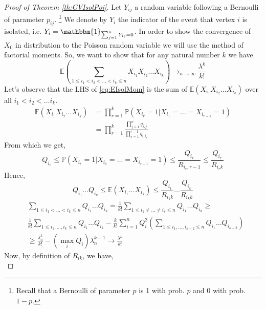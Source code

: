 \begin{proof}[Proof of Theorem \ref{th:CVIsolPoi}]
	Let $Y_{ij}$ a random variable following a Bernoulli of parameter $p_{ij}$.
	\footnote{ Recall that a Bernoulli of parameter $p$ is 1 with prob. $p$ and 0 with prob. $1-p$.}
	We denote by $Y_i$ the indicator of the event that vertex $i$ is isolated, i.e. $Y_i = \mathbbm{1}_{\sum_{j=1}^n Y_{ij} = 0}$.
	In order to show the convergence of $X_0$ in distribution to the Poisson random variable we will use the method of factorial moments.
	So, we want to show that for any natural number $k$ we have
	\begin{equation}\label{eq:EIsolMom}
		\mathbb{E}(\sum_{1\leq i_1<i_2< \ldots < i_k \leq n} X_{i_1}X_{i_2}\ldots X_{i_k}) \to_{n \to \infty} \frac{\lambda^k}{k!}
	\end{equation}
	Let's observe that the LHS of \eqref{eq:EIsolMom} is the sum of $\mathbb{E}(X_{i_1}X_{i_2}\ldots X_{i_k})$ over all $i_1 < i_2 < \ldots i_k$.
	\begin{align}
		\mathbb{E}(X_{i_1}X_{i_2}\ldots X_{i_k}) 	&= \prod_{r=1}^k \mathbb{P}(X_{i_r} = 1 | X_{i_1} = \ldots = X_{i_{r-1}} = 1) \\
							&= \prod_{r=1}^k\frac{ \prod_{j=1}^n q_{i_r j} }{ \prod_{s=1}^{r-1}q_{i_r i_s}}
	\end{align}
	From which we get,
	\begin{equation}
		Q_{i_r} \leq \mathbb{P}(X_{i_r} = 1 | X_{i_1} = \ldots = X_{i_{r-1}} = 1) \leq \frac{Q_{i_r}}{R_{i_r, r-1}} \leq \frac{Q_{i_r}}{R_{i_r k}} 
	\end{equation}
	Hence,
	\begin{equation}
		Q_{i_1} \ldots Q_{i_k} \leq \mathbb{E}(X_{i_1}\ldots X_{i_k}) \leq \frac{Q_{i_1}}{R_{i_1 k}} \ldots \frac{Q_{i_k}}{R_{i_k k}}
	\end{equation}
 	\begin{align}\label{eq:CVDOWN}
		&\sum_{1\leq i_1 < \ldots < i_k \leq n} Q_{i_1} \ldots Q_{i_k} = \frac{1}{k!}\sum_{1 \leq i_1 \neq \ldots \neq i_r \leq n} Q_{i_1} \ldots Q_{i_k} \geq\\
	     & \frac{1}{k!} \sum_{1\leq i_1, \ldots, i_k \leq n} Q_{i_1}\ldots Q_{i_k} 
		- \frac{k}{k!}\sum_{i=1}^n Q_i^2(\sum_{1 \leq i_1, \ldots, i_{k-2} \leq n} Q_{i_1} \ldots Q_{i_{k-2}})\\
		&\geq \frac{\lambda_n^k}{k!} - (\max_i Q_i)\lambda_n^{k-1} \longrightarrow \frac{\lambda^k}{k!}
 	\end{align}
 	Now, by definition of $R_{ik}$, we have,
 	\begin{equation}

\end{equation}
\end{proof}
